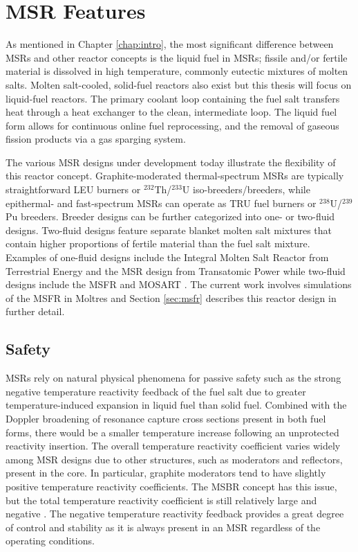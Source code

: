 \section{\gls{MSR} Features}

As mentioned in Chapter \ref{chap:intro}, the most significant difference
between \glspl{MSR} and other reactor concepts is the liquid fuel in
\glspl{MSR}; fissile and/or fertile material is dissolved in high temperature,
commonly eutectic mixtures of molten salts. Molten salt-cooled, solid-fuel
reactors also exist but this thesis will focus on liquid-fuel reactors.
The primary coolant loop containing the fuel salt
transfers heat through a heat exchanger to the clean, intermediate
loop. The liquid fuel form allows for continuous online fuel reprocessing,
and the removal of gaseous fission products via a gas sparging system.

The various \gls{MSR} designs under development today illustrate the
flexibility of this reactor concept. Graphite-moderated thermal-spectrum
\glspl{MSR} are typically straightforward \gls{LEU} burners or
$^{232}$Th/$^{233}$U iso-breeders/breeders, while epithermal- and
fast-spectrum \glspl{MSR} can operate as \gls{TRU} fuel burners or
$^{238}$U/$^{239}$Pu breeders. Breeder designs can be further categorized into
one- or two-fluid designs. Two-fluid designs feature separate blanket molten
salt mixtures that contain higher proportions of fertile material than the
fuel salt mixture. Examples of one-fluid designs include the Integral Molten
Salt Reactor from Terrestrial Energy \cite{leblanc_integral_2015} and the
\gls{MSR} design from Transatomic Power
\cite{transatomic_power_corporation_technical_2016} while two-fluid designs
include the \gls{MSFR} \cite{merle_optimized_2007} and \gls{MOSART}
\cite{ignatiev_molten_2014}. The current work involves simulations of
the \gls{MSFR} in Moltres and Section \ref{sec:msfr} describes this reactor
design in further detail.

\subsection{Safety}

\glspl{MSR} rely on natural physical phenomena for passive safety such as the
strong negative temperature reactivity feedback of the fuel salt due to
greater temperature-induced expansion in liquid fuel than solid
fuel. Combined with the Doppler broadening of resonance capture cross sections
present in both fuel forms, there would be a smaller temperature
increase following an unprotected reactivity insertion. The overall
temperature reactivity coefficient varies widely among \gls{MSR}
designs due to other structures, such as moderators and reflectors, present in
the core. In particular, graphite moderators tend to have slightly positive
temperature reactivity coefficients. The \gls{MSBR} concept has this issue,
but the total temperature reactivity coefficient is still relatively large and
negative \cite{rykhlevskii_modeling_2019}. The negative temperature reactivity
feedback provides a great degree of control and stability as it is always
present in an \gls{MSR} regardless of the operating conditions.

